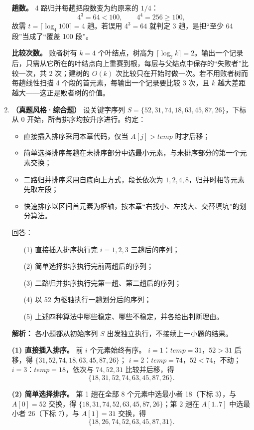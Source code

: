 \begin{enumerate}[start=7]
\textbf{趟数。} 4 路归并每趟把段数变为约原来的 $1/4$：
\[
4^3=64<100,\qquad 4^4=256\geqslant 100,
\]
故需 $t=\lceil\log_4 100\rceil=4$ 趟。若误用 $4^3=64$ 就判定 3 趟，是把“至少 64 段”当成了“覆盖 100 段”。

\textbf{比较次数。} 败者树有 $k=4$ 个叶结点，树高为 $\lceil\log_2 k\rceil=2$。输出一个记录后，只需从它所在的叶结点向上重赛到根，每层与父结点中保存的“失败者”比较一次，共 2 次；建树的 $O(k)$ 次比较只在开始时做一次。若不用败者树而每趟线性扫描 4 个段的首元素，每输出一个记录要比较 3 次，且 $k$ 越大差距越大——这正是败者树的价值。

\else \answerarea \fi

\item \textbf{（真题风格·综合题）} 设关键字序列 $S=\{52,31,74,18,63,45,87,26\}$，下标从 $0$ 开始，所有排序均按升序进行。约定：
\begin{itemize}
\item 直接插入排序采用本章代码，仅当 $A[j]>temp$ 时才后移；
\item 简单选择排序每趟在未排序部分中选最小元素，与未排序部分的第一个元素交换；
\item 二路归并排序采用自底向上方式，段长依次为 $1,2,4,8$，归并时相等元素先取左段；
\item 快速排序以区间首元素为枢轴，按本章“右找小、左找大、交替填坑”的划分算法。
\end{itemize}
回答：
\begin{enumerate}
\item[(1)] 直接插入排序执行完 $i=1,2,3$ 三趟后的序列；
\item[(2)] 简单选择排序执行完前两趟后的序列；
\item[(3)] 二路归并排序执行完第一趟、第二趟后的序列；
\item[(4)] 以 52 为枢轴执行一趟划分后的序列；
\item[(5)] 上述四种算法中哪些稳定、哪些不稳定，并各给出判断理由。
\end{enumerate}

\ifshowsolutions\par\noindent\textbf{解析：} 各小题都从初始序列 $S$ 出发独立执行，不接续上一小题的结果。

\textbf{(1) 直接插入排序。} 前 $i$ 个元素始终有序。
$i=1$：$temp=31$，$52>31$ 后移，得 $\{31,52,74,18,63,45,87,26\}$；
$i=2$：$temp=74$，$52<74$，不动；
$i=3$：$temp=18$，依次与 $74,52,31$ 比较并后移，得
\[
\{18,31,52,74,63,45,87,26\}.
\]

\textbf{(2) 简单选择排序。} 第 1 趟在全部 8 个元素中选最小者 18（下标 3），与 $A[0]=52$ 交换，得 $\{18,31,74,52,63,45,87,26\}$；第 2 趟在 $A[1..7]$ 中选最小者 26（下标 7），与 $A[1]=31$ 交换，得
\[
\{18,26,74,52,63,45,87,31\}.
\]


\end{enumerate}
